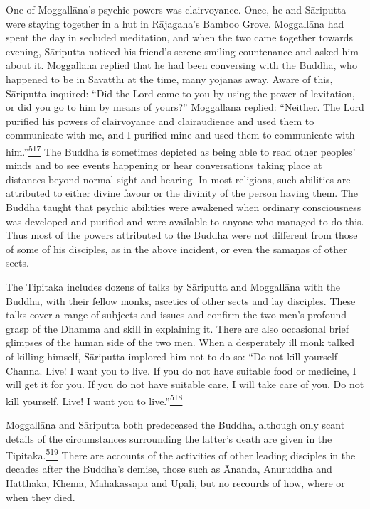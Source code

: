One of Moggallāna's psychic powers was clairvoyance. Once, he and
Sāriputta were staying together in a hut in Rājagaha's Bamboo Grove.
Moggallāna had spent the day in secluded meditation, and when the two
came together towards evening, Sāriputta noticed his friend's serene
smiling countenance and asked him about it. Moggallāna replied that he
had been conversing with the Buddha, who happened to be in Sāvatthī at
the time, many yojanas away. Aware of this, Sāriputta inquired: ``Did
the Lord come to you by using the power of levitation, or did you go to
him by means of yours?'' Moggallāna replied: ``Neither. The Lord
purified his powers of clairvoyance and clairaudience and used them to
communicate with me, and I purified mine and used them to communicate
with
him.''\label{footprints_split_014.html_fnref517}\hyperref[footprints_split_025.htmlux5cux23fn517]{\textsuperscript{517}}
The Buddha is sometimes depicted as being able to read other peoples'
minds and to see events happening or hear conversations taking place at
distances beyond normal sight and hearing. In most religions, such
abilities are attributed to either divine favour or the divinity of the
person having them. The Buddha taught that psychic abilities were
awakened when ordinary consciousness was developed and purified and were
available to anyone who managed to do this. Thus most of the powers
attributed to the Buddha were not different from those of some of his
disciples, as in the above incident, or even the samaṇas of other sects.

The Tipitaka includes dozens of talks by Sāriputta and Moggallāna with
the Buddha, with their fellow monks, ascetics of other sects and lay
disciples. These talks cover a range of subjects and issues and confirm
the two men's profound grasp of the Dhamma and skill in explaining it.
There are also occasional brief glimpses of the human side of the two
men. When a desperately ill monk talked of killing himself, Sāriputta
implored him not to do so: ``Do not kill yourself Channa. Live! I want
you to live. If you do not have suitable food or medicine, I will get it
for you. If you do not have suitable care, I will take care of you. Do
not kill yourself. Live! I want you to
live.''\label{footprints_split_014.html_fnref518}\hyperref[footprints_split_025.htmlux5cux23fn518]{\textsuperscript{518}}

Moggallāna and Sāriputta both predeceased the Buddha, although only
scant details of the circumstances surrounding the latter's death are
given in the
Tipitaka.\label{footprints_split_014.html_fnref519}\hyperref[footprints_split_025.htmlux5cux23fn519]{\textsuperscript{519}}
There are accounts of the activities of other leading disciples in the
decades after the Buddha's demise, those such as Ānanda, Anuruddha and
Hatthaka, Khemā, Mahākassapa and Upāli, but no recourds of how, where or
when they died.

